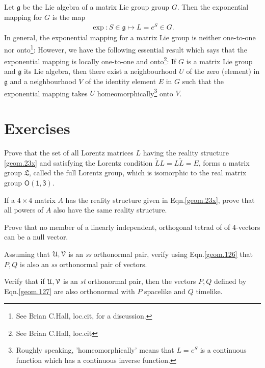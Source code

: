 { Let 
$\mathfrak{g}$ be the Lie algebra of a matrix Lie 
group 
group $G$. Then the exponential mapping for $G$ is the 
map
\begin{align}\label{geom.41}
 \exp : S\in\mathfrak{g} \mapsto L=e^{S}\in G.
\end{align}
In general, the exponential mapping for a matrix Lie  
group is neither one-to-one nor onto\footnote{See 
Brian 
C.Hall, loc.cit, for a discussion.}: However, we have 
the  following essential result which says that the 
exponential mapping is locally one-to-one and 
onto\footnote{See Brian C.Hall, loc.cit}: \thm If $G$ 
is a matrix Lie group and $\mathfrak{g}$ its Lie 
algebra, then there exist  a neighbourhood $U$ of the 
zero (element) in $\mathfrak{g}$ and a neighbourhood 
$V$ of the identity element $E$ in $G$ such that the 
exponential mapping takes $U$ 
homeomorphically\footnote{Roughly speaking, 
'homeomorphically'  means that  $L=e^{S}$ is a 
continuous function which has a continuous inverse 
function.} onto $V$.

\section*{Exercises}

\exise Prove that the set of all Lorentz matrices $L$ 
having the reality structure  \eqref{geom.23x} and 
satisfying the Lorentz condition 
$\tilde{L}L=L\tilde{L}=E$, forms a matrix group 
$\mathfrak{L}$, called the {full Lorentz group}, which 
is isomorphic to the real matrix group 
$\mathsf{\mathsf{O}(1,3)}$.

\exise If a $4\times 4$ matrix $A$ has the reality 
structure given in Eqn.\eqref{geom.23x},  prove that 
all powers of $A$ also have the same reality structure.

\exise Prove that no member of a linearly independent, 
orthogonal tetrad of of 4-vectors can be a 
null vector. 

\exise Assuming that $\EuScript{U},\EuScript{V}$ is an 
\textsl{ss} orthonormal  pair, verify using 
Eqn.\eqref{geom.126} that $P,Q$ is also an   
\textsl{ss} orthonormal pair of vectors.

\exise Verify that if $\EuScript{U},\EuScript{V}$ is 
an 
\textsl{st} orthonormal pair, then the vectors  $P,Q$ 
defined by Eqn.\eqref{geom.127} are also orthonormal 
with $P$ spacelike and $Q$ timelike.

}
